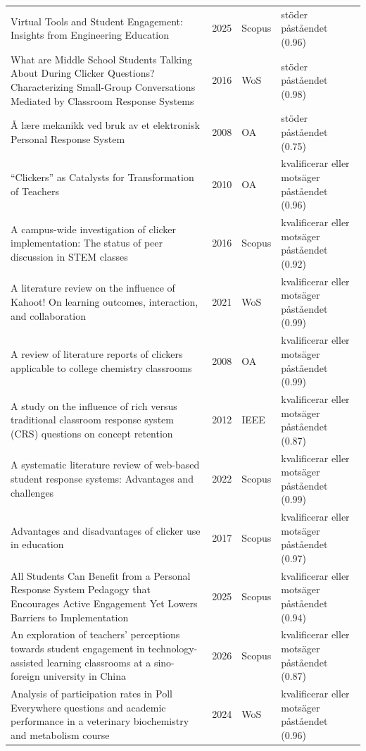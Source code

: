 \begin{longtable}{@{}%
  >{\raggedright\arraybackslash}p{}c%
  >{\raggedright\arraybackslash}p{}%
  >{\raggedright\arraybackslash}p{}@{}}
Virtual Tools and Student Engagement: Insights from Engineering Education & 2025 & Scopus & stöder påståendet (0.96) \\
What are Middle School Students Talking About During Clicker Questions? Characterizing Small-Group Conversations Mediated by Classroom Response Systems & 2016 & WoS & stöder påståendet (0.98) \\
Å lære mekanikk ved bruk av et elektronisk \textquotedbl{}Personal Response System\textquotedbl{} & 2008 & OA & stöder påståendet (0.75) \\
``Clickers'' as Catalysts for Transformation of Teachers & 2010 & OA & kvalificerar eller motsäger påståendet (0.96) \\
A campus-wide investigation of clicker implementation: The status of peer discussion in STEM classes & 2016 & Scopus & kvalificerar eller motsäger påståendet (0.92) \\
A literature review on the influence of Kahoot! On learning outcomes, interaction, and collaboration & 2021 & WoS & kvalificerar eller motsäger påståendet (0.99) \\
A review of literature reports of clickers applicable to college chemistry classrooms & 2008 & OA & kvalificerar eller motsäger påståendet (0.99) \\
A study on the influence of rich versus traditional classroom response system (CRS) questions on concept retention & 2012 & IEEE & kvalificerar eller motsäger påståendet (0.87) \\
A systematic literature review of web-based student response systems: Advantages and challenges & 2022 & Scopus & kvalificerar eller motsäger påståendet (0.99) \\
Advantages and disadvantages of clicker use in education & 2017 & Scopus & kvalificerar eller motsäger påståendet (0.97) \\
All Students Can Benefit from a Personal Response System Pedagogy that Encourages Active Engagement Yet Lowers Barriers to Implementation & 2025 & Scopus & kvalificerar eller motsäger påståendet (0.94) \\
An exploration of teachers' perceptions towards student engagement in technology-assisted learning classrooms at a sino-foreign university in China & 2026 & Scopus & kvalificerar eller motsäger påståendet (0.87) \\
Analysis of participation rates in Poll Everywhere questions and academic performance in a veterinary biochemistry and metabolism course & 2024 & WoS & kvalificerar eller motsäger påståendet (0.96) \\

\end{longtable}
